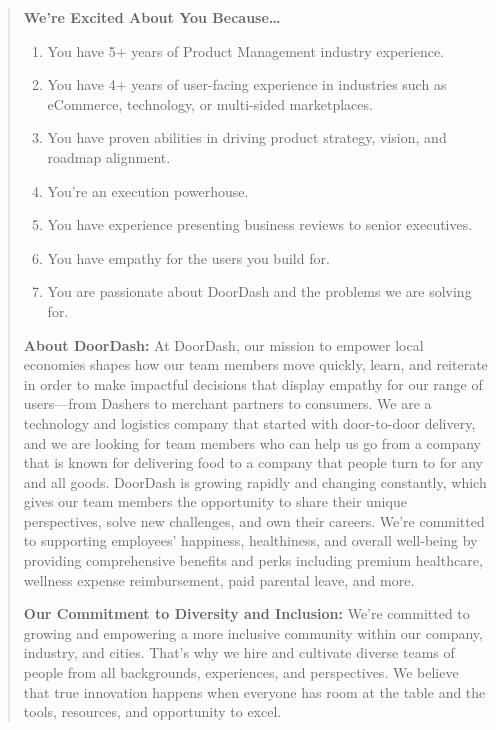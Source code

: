 \begin{quote}
    \textbf{We’re Excited About You Because…}
    \begin{enumerate}
        \item You have 5+ years of Product Management industry experience.
        \item You have 4+ years of user-facing experience in industries such as eCommerce, technology, or multi-sided marketplaces.
        \item You have proven abilities in driving product strategy, vision, and roadmap alignment.
        \item You’re an execution powerhouse.
        \item You have experience presenting business reviews to senior executives.
        \item You have empathy for the users you build for.
        \item You are passionate about DoorDash and the problems we are solving for.
    \end{enumerate}
    
    \textbf{About DoorDash:} At DoorDash, our mission to empower local economies shapes how our team members move quickly, learn, and reiterate in order to make impactful decisions that display empathy for our range of users—from Dashers to merchant partners to consumers. We are a technology and logistics company that started with door-to-door delivery, and we are looking for team members who can help us go from a company that is known for delivering food to a company that people turn to for any and all goods. DoorDash is growing rapidly and changing constantly, which gives our team members the opportunity to share their unique perspectives, solve new challenges, and own their careers. We're committed to supporting employees’ happiness, healthiness, and overall well-being by providing comprehensive benefits and perks including premium healthcare, wellness expense reimbursement, paid parental leave, and more.
    
    \textbf{Our Commitment to Diversity and Inclusion:} We’re committed to growing and empowering a more inclusive community within our company, industry, and cities. That’s why we hire and cultivate diverse teams of people from all backgrounds, experiences, and perspectives. We believe that true innovation happens when everyone has room at the table and the tools, resources, and opportunity to excel.
    

\end{quote}
